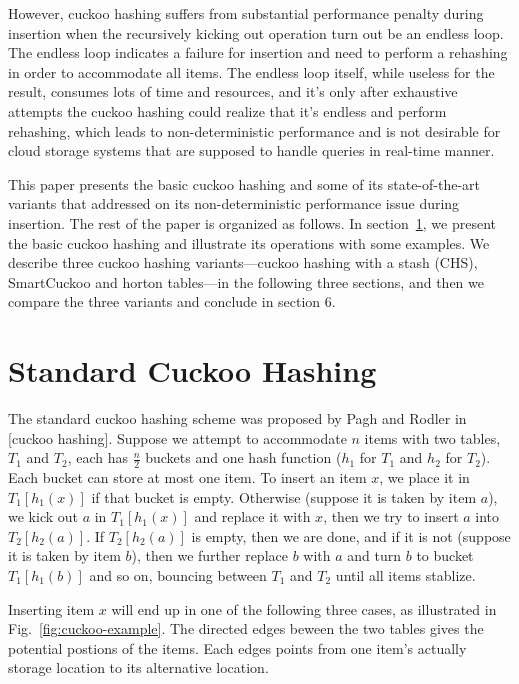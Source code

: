 \documentclass[12pt,conference,compsoc]{IEEEtran}
\begin{document}
However, cuckoo hashing suffers from substantial performance penalty during insertion when the recursively kicking out operation turn out be an endless loop. The endless loop indicates a failure for insertion and need to perform a rehashing in order to accommodate all items. The endless loop itself, while useless for the result, consumes lots of time and resources, and it's only after exhaustive attempts the cuckoo hashing could realize that it's endless and perform rehashing, which leads to non-deterministic performance and is not desirable for cloud storage systems that are supposed to handle queries in real-time manner. 

This paper presents the basic cuckoo hashing and some of its state-of-the-art variants that addressed on its non-deterministic performance issue during insertion. The rest of the paper is organized as follows. In section~\ref{sec:cuckoo}, we present the basic cuckoo hashing and illustrate its operations with some examples. We describe three cuckoo hashing variants---cuckoo hashing with a stash (CHS), SmartCuckoo and horton tables---in the following three sections, and then we compare the three variants and conclude in section 6.

\section{Standard Cuckoo Hashing}
\label{sec:cuckoo}
The standard cuckoo hashing scheme was proposed by Pagh and Rodler in [cuckoo hashing]. Suppose we attempt to accommodate $n$ items with two tables, $T_1$ and $T_2$, each has $\frac{n}{2}$ buckets and one hash function ($h_1$ for $T_1$ and $h_2$ for $T_2$). Each bucket can store at most one item. To insert an item $x$, we place it in $T_1[h_1(x)]$ if that bucket is empty. Otherwise (suppose it is taken by item $a$), we kick out $a$ in $T_1[h_1(x)]$ and replace it with $x$, then we try to insert $a$ into $T_2[h_2(a)]$. If $T_2[h_2(a)]$ is empty, then we are done, and if it is not (suppose it is taken by item $b$), then we further replace $b$ with $a$ and turn $b$ to bucket $T_1[h_1(b)]$ and so on, bouncing between $T_1$ and $T_2$ until all items stablize.

Inserting item $x$ will end up in one of the following three cases, as illustrated in Fig.~\ref{fig:cuckoo-example}. The directed edges beween the two tables gives the potential postions of the items. Each edges points from one item's actually storage location to its alternative location.
\end{document}
